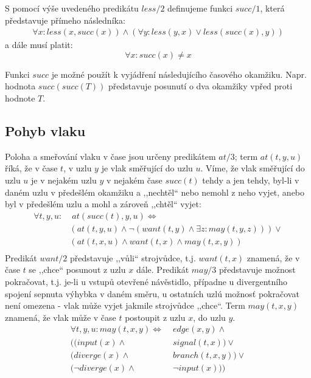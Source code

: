 \documentclass[a4paper,journal]{IEEEtran}
\begin{document}
S pomocí výše uvedeného predikátu $less/2$ definujeme funkci $succ/1$, která představuje přímeho následníka:
\begin{equation}
\begin{split}
\forall x:less(x,succ(x)) \wedge
(\forall y:less(y,x) \vee 
less(succ(x),y))
\end{split}
\end{equation}
a dále musí platit:
\begin{equation}\label{eq:succ_neq}
\forall x: succ(x) \not = x
\end{equation}

Funkci $succ$ je možné použít k vyjádření následujícího časového okamžiku.
Napr. hodnota $succ(succ(T))$ představuje posunutí o dva okamžiky vpřed proti hodnote $T$.

\subsection{Pohyb vlaku}
Poloha a smeřování vlaku v čase jsou určeny predikátem $at/3$; term $at(t,y,u)$ říká, že v čase $t$, v uzlu $y$ je vlak směřující do
uzlu $u$. Víme, že vlak směřující do uzlu $u$ je v nejakém uzlu $y$ v nejakém čase $succ(t)$ tehdy a jen tehdy, byl-li v daném uzlu
v předešlém okamžiku a ,,nechtěl`` nebo nemohl z neho vyjet, anebo byl v předešlém uzlu a mohl a zároveň ,,chtěl`` vyjet:
\begin{equation}\label{eq:move}
\begin{split}
\forall t,y,u:&\; at(succ(t),y,u) \Leftrightarrow\\
&(at(t,y,u) \wedge \neg (want(t,y) \wedge \exists z:may(t,y,z))) \vee\\
&(at(t,x,u) \wedge want(t,x) \wedge may(t,x,y))\\ 
\end{split}
\end{equation}
Predikát $want/2$ představuje ,,vůli`` strojvůdce, t.j. $want(t,x)$ znamená, že v čase $t$ se ,,chce`` posunout z uzlu $x$ dále.
Predikát $may/3$ představuje možnost pokračovat, t.j. je-li u vstupů otevřené návěstidlo, případne u divergentního spojení sepnuta výhybka v daném směru, u ostatních uzlú možnosť pokračovat není omezena - 
vlak může vyjet jakmile strojvůdce ,,chce``.
Term $may(t,x,y)$ znamená, že vlak může v čase $t$ postoupit z uzlu $x$, do uzlu $y$. 
\begin{equation}
\begin{split}
\forall t,y,u: may(t,x,y) \Leftrightarrow &\; edge(x,y) \wedge \\
( (input(x) \wedge &\; signal(t,x) ) \vee \\
(diverge(x) \wedge &\; branch(t,x,y)) \vee \\
(\neg diverge(x) \wedge &\; \neg input(x) ))
\end{split}
\end{equation}
\end{document}
